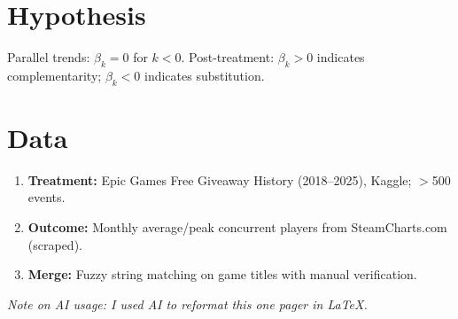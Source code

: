 \documentclass[11pt]{article}
\begin{document}
\section{Hypothesis}
Parallel trends: $\beta_k = 0$ for $k < 0$. Post-treatment: $\beta_k > 0$ indicates complementarity; $\beta_k < 0$ indicates substitution.

\section{Data}
\begin{enumerate}
  \item \textbf{Treatment:} Epic Games Free Giveaway History (2018--2025), Kaggle; $>$500 events.
  \item \textbf{Outcome:} Monthly average/peak concurrent players from SteamCharts.com (scraped).
  \item \textbf{Merge:} Fuzzy string matching on game titles with manual verification.
\end{enumerate}


\vspace{1em}
\noindent\textit{Note on AI usage: I used AI to reformat this one pager in \LaTeX.}
\end{document}
